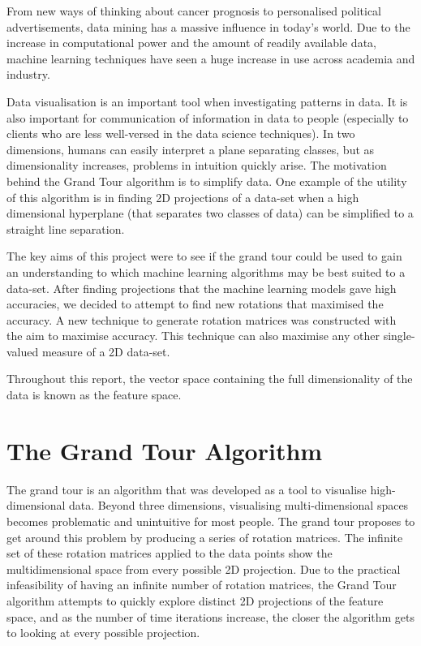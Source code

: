 \documentclass[a4paper,11pt,twoside]{article}
\begin{document}
From new ways of thinking about cancer prognosis to personalised political advertisements, data mining has a massive influence in today’s world. Due to the increase in computational power and the amount of readily available data, machine learning techniques have seen a huge increase in use across academia and industry. 
\newline

Data visualisation is an important tool when investigating patterns in data. It is also important for communication of information in data to people (especially to clients who are less well-versed in the data science techniques). In two dimensions, humans can easily interpret a plane separating classes, but as dimensionality increases, problems in intuition quickly arise. The motivation behind the Grand Tour algorithm is to simplify data. One example of the utility of this algorithm is in finding 2D projections of a data-set when a high dimensional hyperplane (that separates two classes of data) can be simplified to a straight line separation.
\newline

The key aims of this project were to see if the grand tour could be used to gain an understanding to which machine learning algorithms may be best suited to a data-set. After finding projections that the machine learning models gave high accuracies, we decided to attempt to find new rotations that maximised the accuracy. A new technique to generate rotation matrices was constructed with the aim to maximise accuracy. This technique can also maximise any other single-valued measure of a 2D data-set.
\newline

Throughout this report, the vector space containing the full dimensionality of the data is known as the feature space.

\newpage
\section{The Grand Tour Algorithm}

The grand tour is an algorithm that was developed as a tool to visualise high-dimensional data. Beyond three dimensions, visualising multi-dimensional spaces becomes problematic and unintuitive for most people. The grand tour proposes to get around this problem by producing a series of rotation matrices. The infinite set of these rotation matrices applied to the data points show the multidimensional space from every possible 2D projection. Due to the practical infeasibility of having an infinite number of rotation matrices, the Grand Tour algorithm attempts to quickly explore distinct 2D projections of the feature space, and as the number of time iterations increase, the closer the algorithm gets to looking at every possible projection. 
\newline
\end{document}
